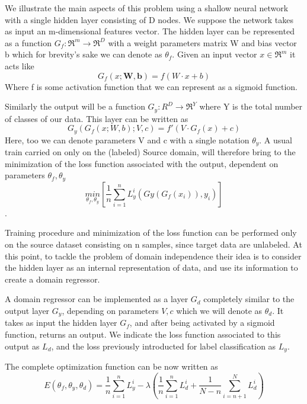 \documentclass[10pt]{report}
\begin{document}
We illustrate the main aspects of this problem using a shallow neural network with a single hidden layer consisting of D nodes.
We suppose the network takes as input an m-dimensional features vector.
The hidden layer can be represented as a function $G_f : \Re^m \rightarrow \Re^D$ with a weight parameters matrix W and bias vector b which for brevity's sake we can denote as $\theta_f$.
Given an input vector $x \in \Re^m$ it acts like
\begin{equation}
G_f(x; \mathbf{W}, \mathbf{b}) = f(W\cdot x + b)
\end{equation}
Where f is some activation function that we can represent as a sigmoid function.

Similarly the output will be a function $G_y:R^D \rightarrow \Re^Y$ where Y is the total number of classes of our data. This layer can be written as
\begin{equation}
G_y(G_f(x; W, b); V, c) = f'(V\cdot G_f(x) + c)
\end{equation}
Here, too we can denote parameters V and c with a single notation $\theta_y$.
A usual train carried on only on the (labeled) Source domain, will therefore bring to the minimization of the loss function associated with the output, dependent on parameters $\theta_f, \theta_y$
\begin{equation}
\underset{\theta_f, \theta_y}{min} [ \frac{1}{n}\sum_{i = 1}^n L_y^i(Gy(G_f(x_i)), y_i )]
\end{equation}.

Training procedure and minimization of the loss function can be performed only on the source dataset consisting on n samples, since target data are unlabeled.
At this point, to tackle the problem of domain independence their idea is to consider the hidden layer as an internal representation of data, and use its information to create a domain regressor.

A domain regressor can be implemented as a layer $G_d$ completely similar to the output layer $G_y$, depending on parameters $V, c$ which we will denote as $\theta_d$. It takes as input the hidden layer $G_f$, and after being activated by a sigmoid function, returns an output.
We indicate the loss function associated to this output as $L_d$, and the loss previously introducted for label classification as $L_y$.

The complete optimization function can be now written as
\begin{equation}
E(\theta_f, \theta_y, \theta_d) = \frac{1}{n} \sum_{i = 1}^n L_y^i - \lambda (\frac{1}{n} \sum_{i = 1}^n L_d^i + \frac{1}{N-n} \sum_{i = n+1}^N L_d^i)
\end{equation}
\end{document}
